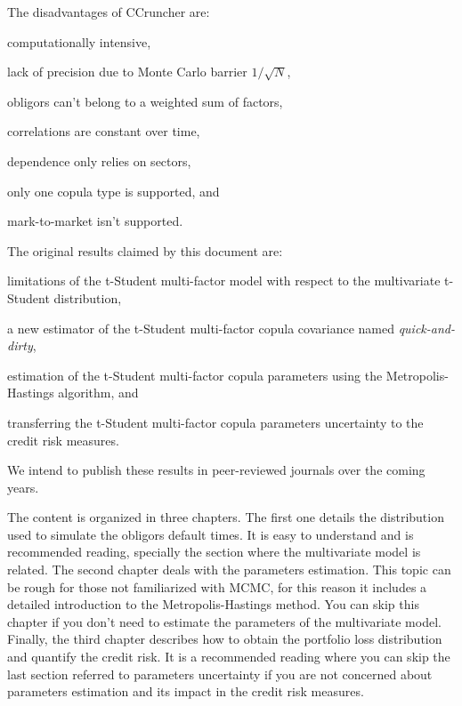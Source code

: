 \documentclass[11pt,fleqn]{book} %
\begin{document}
The disadvantages of CCruncher are: 
\begin{inparaenum}[1)]
	\item computationally intensive,
	\item lack of precision due to Monte Carlo barrier $1/\sqrt{N}$,
	\item obligors can't belong to a weighted sum of factors,
	\item correlations are constant over time,
	\item dependence only relies on sectors,
	\item only one copula type is supported, and
	\item mark-to-market isn't supported.
\end{inparaenum}

The original results claimed by this document are: 
\begin{inparaenum}[1)]
	\item limitations of the t-Student multi-factor model with respect to 
	the multivariate t-Student distribution,
	\item a new estimator of the t-Student multi-factor copula covariance named 
	\emph{quick-and-dirty},
	\item estimation of the t-Student multi-factor copula parameters using the 
	Metropolis-Hastings algorithm, and
	\item transferring the t-Student multi-factor copula parameters uncertainty 
	to the credit risk measures.
\end{inparaenum}
We intend to publish these results in peer-reviewed journals over the coming years.

The content is organized in three chapters. The first one details the 
distribution used to simulate the obligors default times. It is easy to 
understand and is recommended reading, specially the section where the 
multivariate model is related. The second chapter deals with the parameters 
estimation. This topic can be rough for those not familiarized 
with MCMC, for this reason it includes a detailed introduction to the 
Metropolis-Hastings method. You can skip this chapter if you don't need 
to estimate the parameters of the multivariate model. Finally, the 
third chapter describes how to obtain the portfolio loss distribution and 
quantify the credit risk. It is a recommended reading where you can skip the 
last section referred to parameters uncertainty if you are not concerned about 
parameters estimation and its impact in the credit risk measures.
\end{document}
